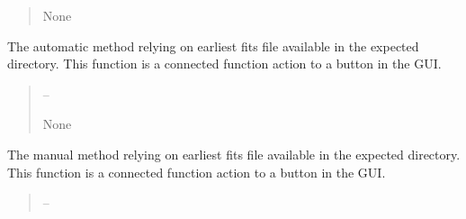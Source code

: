 \documentclass[letterpaper,11pt,english]{sphinxmanual}
\begin{document}
\begin{savenotes}
\begin{fulllineitems}
\begin{savenotes}
\begin{fulllineitems}
\begin{quote}
\begin{description}
\sphinxAtStartPar
None

\end{description}\end{quote}

\end{fulllineitems}\end{savenotes}


\begin{savenotes}\begin{fulllineitems}
\label{\detokenize{code/opihiexarata.gui.manual:opihiexarata.gui.manual.OpihiManualWindow.__connect_push_button_new_image_automatic}}
\pysigstartsignatures
{}
\pysigstopsignatures
\sphinxAtStartPar
The automatic method relying on earliest fits file available in
the expected directory. This function is a connected function action to
a button in the GUI.
\begin{quote}\begin{description}
\sphinxAtStartPar
{} – 

\sphinxAtStartPar
None

\end{description}\end{quote}

\end{fulllineitems}\end{savenotes}


\begin{savenotes}\begin{fulllineitems}
\label{\detokenize{code/opihiexarata.gui.manual:opihiexarata.gui.manual.OpihiManualWindow.__connect_push_button_new_image_manual}}
\pysigstartsignatures
{}
\pysigstopsignatures
\sphinxAtStartPar
The manual method relying on earliest fits file available in
the expected directory. This function is a connected function action to
a button in the GUI.
\begin{quote}\begin{description}
\sphinxAtStartPar
{} – 


\end{description}
\end{quote}
\end{fulllineitems}
\end{savenotes}
\end{fulllineitems}
\end{savenotes}
\end{document}
